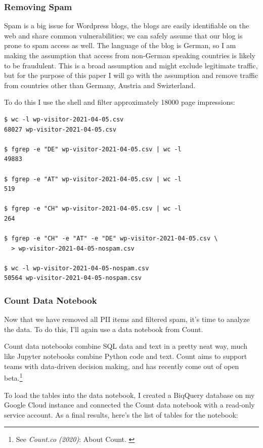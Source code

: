 \subsubsection{Removing Spam}

Spam is a big issue for Wordpress blogs, the blogs are easily identifiable on the web and share common vulnerabilities; we can safely assume that our blog is prone to spam access as well. The language of the blog is German, so I am making the assumption that access from non-German speaking countries is likely to be fraudulent. This is a broad assumption and might exclude legitimate traffic, but for the purpose of this paper I will go with the assumption and remove traffic from countries other than Germany, Austria and Swizterland. 

To do this I use the shell and filter approximately 18000 page impressions:

\begin{lstlisting}[caption=Removing Spam, frame=single, basicstyle=\ttfamily]
$ wc -l wp-visitor-2021-04-05.csv
68027 wp-visitor-2021-04-05.csv

$ fgrep -e "DE" wp-visitor-2021-04-05.csv | wc -l
49883

$ fgrep -e "AT" wp-visitor-2021-04-05.csv | wc -l
519

$ fgrep -e "CH" wp-visitor-2021-04-05.csv | wc -l
264

$ fgrep -e "CH" -e "AT" -e "DE" wp-visitor-2021-04-05.csv \
  > wp-visitor-2021-04-05-nospam.csv

$ wc -l wp-visitor-2021-04-05-nospam.csv 
50564 wp-visitor-2021-04-05-nospam.csv
\end{lstlisting}

\subsubsection{Count Data Notebook}

Now that we have removed all PII items and filtered spam, it's time to analyze the data. To do this, I'll again use a data notebook from Count.

Count data notebooks combine SQL data and text in a pretty neat way, much like Jupyter notebooks combine Python code and text. Count aims to support teams with data-driven decision making, and has recently come out of open beta.\footnote{See \textit{Count.co (2020)}: About Count. \cite{aboutCount}}

To load the tables into the data notebook, I created a BiqQuery database on my Google Cloud instance and connected the Count data notebook with a read-only service account. As a final results, here's the list of tables for the notebook:

